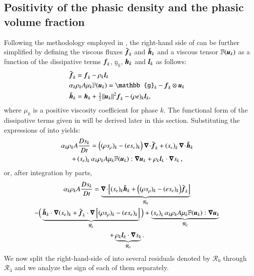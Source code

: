 \subsection{Positivity of the phasic density and the phasic volume fraction}\label{sct:positivity}
%
Following the methodology employed in \cite{jlg,Marco_paper_low_mach}, the right-hand side of 
 can be further simplified by defining the viscous fluxes $\tilde{\boldsymbol f}_k$ and 
$\tilde{\boldsymbol h}_k$ and a viscous tensor $\mathbb{F}(\boldsymbol u_k)$ as a function of the dissipative terms $\boldsymbol f_k$, $\mathbb{g}_k$, $\boldsymbol h_k$ and $\boldsymbol l_k$ as follows:
%
\begin{subequations}\label{eq:def-diss-terms-sect4}
\begin{align}
& \tilde{\mbold f}_k   =   \mbold f_k - \rho_k \mbold  l_k
  \\
&  \alpha_k \rho_k A \mu_k \mathbb{F}(\mbold u_k) =  \mathbb{g}_k -  \mbold f_k \otimes \mbold u_k
  \\
&  \tilde{\mbold h}_k =   \mbold h_k + \tfrac{1}{2}\| \mbold u_k\|^2  \mbold f_k - (\rho e)_k \mbold l_k,
\end{align}
\end{subequations}
%
where $\mu_k$ is a positive viscosity coefficient for phase $k$. The functional form of the dissipative terms given in 
 will be derived later in this section. Substituting the expressions of  
into  yields:
%
\begin{multline}\label{eq:ent-res-7-eqn-diss-terms_rearranged2}
\alpha_k \rho_k A \frac{Ds_k}{Dt} 
=  \left( (\rho s_\rho)_k - (e s_e)_k \right) \boldsymbol\nabla\! \cdot \! \tilde{\boldsymbol f}_k 
+ \left(s_e\right)_k \boldsymbol\nabla\! \cdot \! \tilde{ \boldsymbol h} _k \\
+ \left(s_e\right)_k \alpha_k \rho_k A \mu_k \mathbb{F}(\boldsymbol u_k) : \boldsymbol\nabla \boldsymbol u_k 
+ \rho_k \boldsymbol l _k \cdot \boldsymbol\nabla s_k \,,
\end{multline}
%
or, after integration by parts,
%
\begin{multline}\label{eq:ent-res-7-eqn-diss-terms2}
\alpha_k \rho_k A \frac{Ds_k}{Dt} = 
\underbrace{\boldsymbol\nabla\! \cdot \! \left[ (s_e)_k\tilde{\boldsymbol h}_k +\Big( (\rho s_\rho)_k - (e s_e)_k \Big) \tilde{\boldsymbol f}_k \right]}_{{\mathcal{R}_0}} \\
-\Big(
\underbrace{\tilde{\boldsymbol h}_k \cdot \boldsymbol\nabla (s_e)_k + \tilde{\boldsymbol f}_k \cdot \boldsymbol\nabla \left[  (\rho s_\rho)_k - (e s_e)_k \right]}_{\mathcal{R}_1} 
\Big)
+ \underbrace{ \left(s_e\right)_k \alpha_k \rho_k A \mu_k \mathbb{F}(\boldsymbol u_k) : \boldsymbol\nabla \boldsymbol u_k}_{\mathcal{R}_2} \\
+ \underbrace{\rho_k \boldsymbol l _k \cdot \boldsymbol\nabla s_k}_{\mathcal{R}_3}.
\end{multline}
%
We now split the right-hand-side of  into several residuals denoted by $\mathcal{R}_0$ 
through $\mathcal{R}_3$ and we analyze the sign of each of them separately. 

